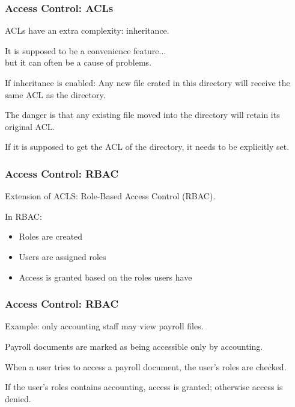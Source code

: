 \begin{frame}
\frametitle{Access Control: ACLs}
\begin{changemargin}{1cm}

ACLs have an extra complexity: inheritance.

It is supposed to be a convenience feature...\\
\quad but it can often be a cause of problems.

If inheritance is enabled: 
Any new file crated in this directory will receive the same ACL as the directory.

The danger is that any existing file moved into the directory will retain its original ACL. 

If it is supposed to get the ACL of the directory, it needs to be explicitly set.

\end{changemargin}
\end{frame}


\begin{frame}
\frametitle{Access Control: RBAC}
\begin{changemargin}{1cm}

Extension of ACLS: Role-Based Access Control (RBAC).

In RBAC:

\begin{itemize}
	\item Roles are created
	\item Users are assigned roles
	\item Access is granted based on the roles users have
\end{itemize}

\end{changemargin}
\end{frame}

\begin{frame}
\frametitle{Access Control: RBAC}
\begin{changemargin}{1cm}

Example: only accounting staff may view payroll files.

Payroll documents are marked as being accessible only by accounting. 

When a user tries to access a payroll document, the user's roles are checked. 

If the user's roles contains accounting, access is granted; otherwise access is denied.

\end{changemargin}
\end{frame}

